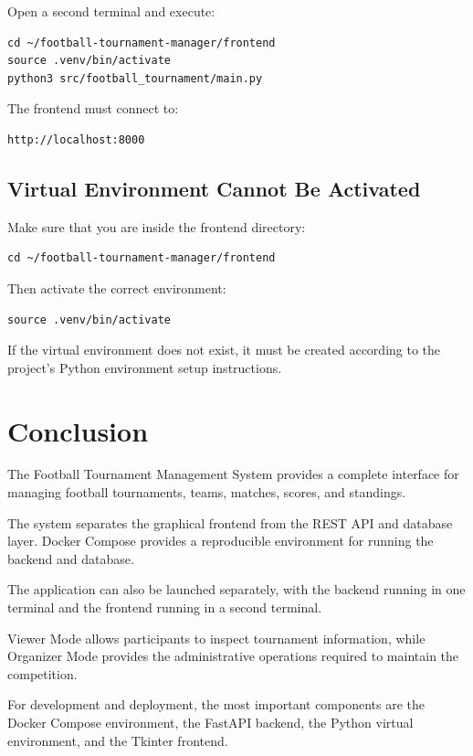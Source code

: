 \documentclass[12pt,a4paper]{article}
\begin{document}
Open a second terminal and execute:

\begin{lstlisting}
cd ~/football-tournament-manager/frontend
source .venv/bin/activate
python3 src/football_tournament/main.py
\end{lstlisting}

The frontend must connect to:

\begin{lstlisting}
http://localhost:8000
\end{lstlisting}

\subsection{Virtual Environment Cannot Be Activated}

Make sure that you are inside the frontend directory:

\begin{lstlisting}
cd ~/football-tournament-manager/frontend
\end{lstlisting}

Then activate the correct environment:

\begin{lstlisting}
source .venv/bin/activate
\end{lstlisting}

If the virtual environment does not exist, it must be created
according to the project's Python environment setup instructions.


\section{Conclusion}

The Football Tournament Management System provides a complete
interface for managing football tournaments, teams, matches,
scores, and standings.

The system separates the graphical frontend from the REST API
and database layer. Docker Compose provides a reproducible
environment for running the backend and database.

The application can also be launched separately, with the
backend running in one terminal and the frontend running in a
second terminal.

Viewer Mode allows participants to inspect tournament
information, while Organizer Mode provides the administrative
operations required to maintain the competition.

For development and deployment, the most important components
are the Docker Compose environment, the FastAPI backend, the
Python virtual environment, and the Tkinter frontend.
\end{document}

